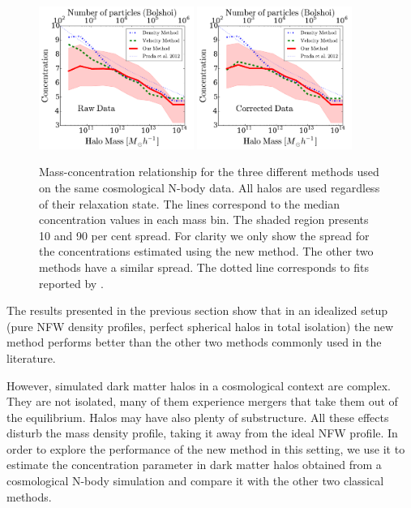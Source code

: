 \documentclass[a4,useAMS,usenatbib,usegraphicx]{mn2e}
\begin{document}
\begin{figure}
\begin{center}
  \includegraphics[width=0.45\textwidth]{concentration_bolshoi.pdf}
  \includegraphics[width=0.45\textwidth]{concentration_bolshoi_corrected.pdf}
\end{center}
\vspace{-0.5cm}
\caption{Mass-concentration relationship for the three different
  methods used on the same cosmological N-body data. 
  All halos are used regardless of their relaxation state.
  The lines correspond to the median concentration values in each mass bin.
  The shaded region presents 10 and 90 per cent spread.
  For clarity we only show the spread for the concentrations estimated
  using the new method. The other two methods have a similar spread. The
  dotted line corresponds to fits reported by \citep{Prada2012}.
  \label{fig:concentration}}
\end{figure}


The results presented in the previous section show that in an
idealized setup (pure NFW density profiles, perfect spherical halos in
total isolation) the new method performs better than the other two
methods commonly used in the literature.

However, simulated dark matter halos in a cosmological context are
complex. 
They are not isolated, many of them  experience mergers that take them
out of the equilibrium. 
Halos may have also plenty of substructure. 
All these effects disturb the mass density profile, taking it  away
from the ideal NFW profile. 
In order to explore the performance of the new method in this setting, we
use it to estimate the  concentration parameter in dark matter halos
obtained from a cosmological N-body simulation and compare it with the
other two classical methods.   
 
\end{document}
